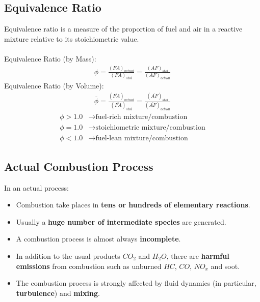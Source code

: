\documentclass[class=report, crop=false, 12pt,a4paper]{standalone}
\numberwithin{equation}{section}
\begin{document}
\subsection{Equivalence Ratio}
Equivalence ratio is a measure of the proportion of fuel and air in a reactive mixture relative to its stoichiometric value. \\\\
Equivalence Ratio (by Mass):
\begin{gather}
  \phi = \frac{(FA)_{actual}}{(FA)_{stoi}} = \frac{(AF)_{stoi}}{(AF)_{actual}}
\end{gather}
Equivalence Ratio (by Volume):
\begin{gather}
  \overline{\phi} = \frac{(\overline{FA})_{actual}}{(\overline{FA})_{stoi}} = \frac{(\overline{AF})_{stoi}}{(\overline{AF})_{actual}}
\end{gather}
\begin{align*}
  \phi > 1.0 &\longrightarrow \text{fuel-rich mixture/combustion} \\[5pt]
  \phi = 1.0 &\longrightarrow \text{stoichiometric mixture/combustion} \\[5pt]
  \phi < 1.0 &\longrightarrow \text{fuel-lean mixture/combustion}
\end{align*}
\subsection{Actual Combustion Process}
In an actual process:
\begin{itemize}[noitemsep]
  \item Combustion take places in \textbf{tens or hundreds of elementary reactions}.
  \item Usually a \textbf{huge number of intermediate species} are generated.
  \item A combustion process is almost always \textbf{incomplete}.
  \item In addition to the usual products $CO_2$ and $H_2O$, there are \textbf{harmful emissions} from combustion such as unburned $HC$, $CO$, $NO_x$ and soot.
  \item The combustion process is strongly affected by fluid dynamics (in particular, \textbf{turbulence}) and \textbf{mixing}. 
\end{itemize}
\end{document}

